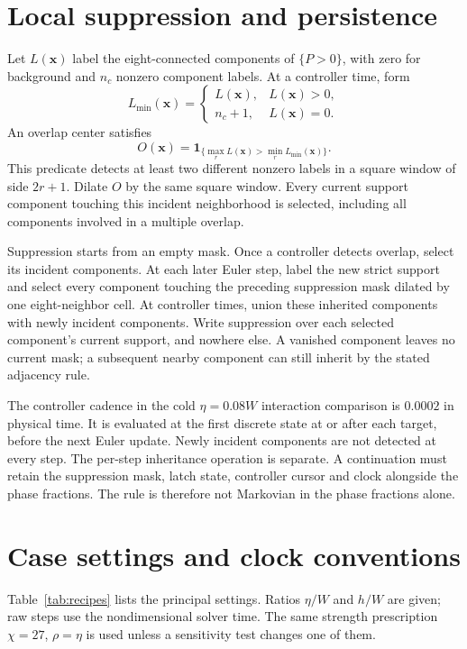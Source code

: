 \documentclass[a4paper,11pt]{article}
\begin{document}
\section{Local suppression and persistence}
Let $L(\mathbf x)$ label the eight-connected components of $\{P>0\}$, with zero for background and $n_c$ nonzero component labels. At a controller time, form
\begin{equation}
 L_{\min}(\mathbf x)=
 \begin{cases}
 L(\mathbf x),&L(\mathbf x)>0,\\
 n_c+1,&L(\mathbf x)=0.
 \end{cases}
\end{equation}
An overlap center satisfies
\begin{equation}
 O(\mathbf x)=
 \mathbf1_{\{\max_r L(\mathbf x)>\min_r L_{\min}(\mathbf x)\}}.
\end{equation}
This predicate detects at least two different nonzero labels in a square window of side $2r+1$. Dilate $O$ by the same square window. Every current support component touching this incident neighborhood is selected, including all components involved in a multiple overlap.

Suppression starts from an empty mask. Once a controller detects overlap, select its incident components. At each later Euler step, label the new strict support and select every component touching the preceding suppression mask dilated by one eight-neighbor cell. At controller times, union these inherited components with newly incident components. Write suppression over each selected component's current support, and nowhere else. A vanished component leaves no current mask; a subsequent nearby component can still inherit by the stated adjacency rule.

The controller cadence in the cold $\eta=0.08W$ interaction comparison is $0.0002$ in physical time. It is evaluated at the first discrete state at or after each target, before the next Euler update. Newly incident components are not detected at every step. The per-step inheritance operation is separate. A continuation must retain the suppression mask, latch state, controller cursor and clock alongside the phase fractions. The rule is therefore not Markovian in the phase fractions alone.

\section{Case settings and clock conventions}
Table~\ref{tab:recipes} lists the principal settings. Ratios $\eta/W$ and $h/W$ are given; raw steps use the nondimensional solver time. The same strength prescription $\chi=27$, $\rho=\eta$ is used unless a sensitivity test changes one of them.
\end{document}
